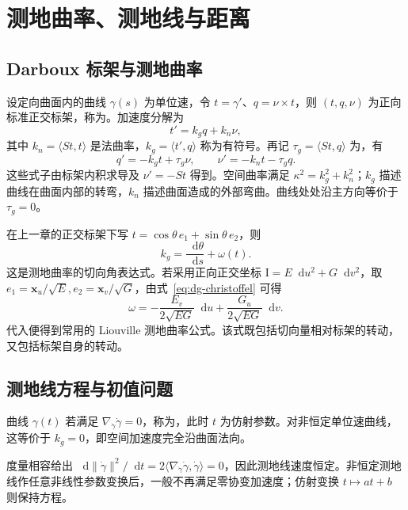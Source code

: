 \documentclass[UTF8,12pt,a4paper,fontset=fandol]{ctexbook}
\newcommand{\dd}{\mathop{}\!\mathrm d}
\newcommand{\ip}[2]{\langle #1,#2\rangle}
\newcommand{\norm}[1]{\lVert #1\rVert}
\begin{document}
\chapter{测地曲率、测地线与距离}
\label{chap:dg-geodesics}

\section{Darboux 标架与测地曲率}
设定向曲面内的曲线 $\gamma(s)$ 为单位速，令 $t=\gamma'$、$q=\nu\times t$，则 $(t,q,\nu)$ 为正向标准正交标架，称为。加速度分解为
\begin{equation}
 t'=k_gq+k_n\nu,
 \label{eq:dg-darboux-first}
\end{equation}
其中 $k_n=\ip{St}t$ 是法曲率，$k_g=\ip{t'}q$ 称为有符号。再记 $\tau_g=\ip{St}q$ 为，有
\[
 q'=-k_gt+\tau_g\nu,\qquad \nu'=-k_nt-\tau_gq.
\]
这些式子由标架内积求导及 $\nu'=-St$ 得到。空间曲率满足 $\kappa^2=k_g^2+k_n^2$；$k_g$ 描述曲线在曲面内部的转弯，$k_n$ 描述曲面造成的外部弯曲。曲线处处沿主方向等价于 $\tau_g=0$。

在上一章的正交标架下写 $t=\cos\theta\,e_1+\sin\theta\,e_2$，则
\begin{equation}
 k_g=\frac{\dd\theta}{\dd s}+\omega(t).
 \label{eq:dg-kg-angle}
\end{equation}
这是测地曲率的切向角表达式。若采用正向正交坐标 $\mathrm I=E\dd u^2+G\dd v^2$，取 $e_1=\mathbf x_u/\sqrt E,e_2=\mathbf x_v/\sqrt G$，由式~\eqref{eq:dg-christoffel} 可得
\[
 \omega=-\frac{E_v}{2\sqrt{EG}}\dd u+
          \frac{G_u}{2\sqrt{EG}}\dd v.
\]
代入便得到常用的 Liouville 测地曲率公式。该式既包括切向量相对标架的转动，又包括标架自身的转动。

\section{测地线方程与初值问题}
\begin{definition}[仿射参数测地线]
曲线 $\gamma(t)$ 若满足 $\nabla_{\dot\gamma}\dot\gamma=0$，称为，此时 $t$ 为仿射参数。对非恒定单位速曲线，这等价于 $k_g=0$，即空间加速度完全沿曲面法向。
\end{definition}
度量相容给出 $\dd\norm{\dot\gamma}^2/\dd t=2\ip{\nabla_{\dot\gamma}\dot\gamma}{\dot\gamma}=0$，因此测地线速度恒定。非恒定测地线作任意非线性参数变换后，一般不再满足零协变加速度；仿射变换 $t\mapsto at+b$ 则保持方程。
\end{document}
